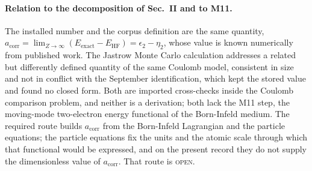 \documentclass[aps,prd,onecolumn,amsmath,amssymb,longbibliography,floatfix,nofootinbib]{revtex4-2}
\newcommand{\acorr}{a_{\mathrm{corr}}}
\newcommand{\st}[1]{\textsc{#1}}
\begin{document}
\paragraph{Relation to the decomposition of Sec.~II and to M11.} The installed number and the corpus definition are the same quantity, $\acorr=\lim_{Z\to\infty}(E_{\mathrm{exact}}-E_{\mathrm{HF}})=\epsilon_2-\eta_2$, whose value is known numerically from published work. The Jastrow Monte Carlo calculation addresses a related but differently defined quantity of the same Coulomb model, consistent in size and not in conflict with the September identification, which kept the stored value and found no closed form. Both are imported cross-checks inside the Coulomb comparison problem, and neither is a derivation; both lack the M11 step, the moving-mode two-electron energy functional of the Born-Infeld medium. The required route builds $\acorr$ from the Born-Infeld Lagrangian and the particle equations; the particle equations fix the units and the atomic scale through which that functional would be expressed, and on the present record they do not supply the dimensionless value of $\acorr$. That route is \st{open}.
\end{document}
